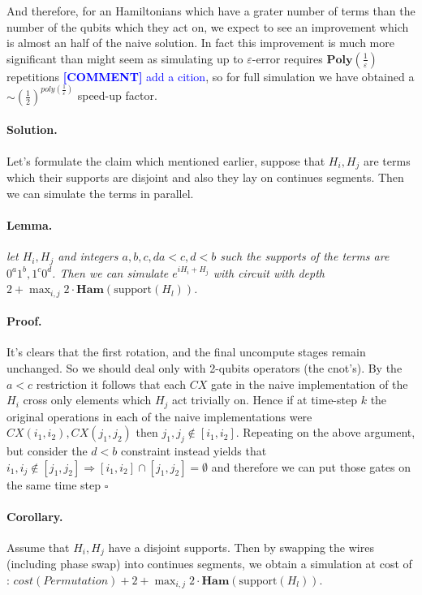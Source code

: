 \documentclass{article}
\newcommand{\commentt}[1]{\textcolor{blue}{ \textbf{[COMMENT]} #1}}
\newcommand{\ctt}[1]{\commentt{#1}}
\begin{document}
\begin{multicols*}{2}
And therefore, for an Hamiltonians which have a grater number of terms than the number of the qubits which they act on, we expect to see an improvement which is almost an half of the naive solution. In fact this improvement is much more significant than might seem as simulating up to \(\varepsilon\)-error requires \(\textbf{Poly} \left( \frac{1}{\varepsilon} \right) \) repetitions\ctt{add a cition}, so for full simulation we have obtained a \( \sim (\frac{1}{2})^{poly(\frac{1}{\varepsilon})} \) speed-up factor.  

\paragraph{Solution.} Let's formulate the claim which mentioned earlier, suppose that \(H_{i} ,H_{j}\) are terms which their supports are disjoint and also they lay on continues segments. Then we can simulate the terms in parallel. 
\paragraph{Lemma.} \textit{ let \(H_{i}, H_{j}\) and integers \(a,b,c,d a < c, d < b\) such the supports of the terms are \( 0^{a}1^{b}, 1^{c}0^{d}\). Then we can simulate \(e^{i H_{i} + H_{j}}\) with circuit with depth \( 2 + \max_{ {i,j} } 2 \cdot \textbf{Ham} ( \text{support} ( H_{l} ) )\).}
\paragraph{Proof.} It's clears that the first rotation, and the final uncompute stages remain unchanged. So we should deal only with 2-qubits operators (the cnot's). By the \( a < c \) restriction it follows that each \(CX\) gate in the naive implementation of the \(H_i\) cross only elements which \(H_j\) act trivially on. Hence if at time-step \(k\) the original operations in each of the naive implementations were \( CX(i_{1} , i_{2}), CX(j_{1} , j_{2}) \) then \( j_{1}, j_{j} \notin [i_{1} , i_{2}] \). Repeating on the above argument, but consider the \(d<b\) constraint instead yields that \( i_{1}, i_{j} \notin [j_{1} , j_{2}] \Rightarrow [i_{1},i_{2}]\cap[j_{1},j_{2}] = \emptyset  \) and therefore we can put those gates on the same time step \( \square\)   

\paragraph{Corollary.} Assume that \(H_{i}, H_{j}\) have a disjoint supports. Then by swapping the wires (including phase swap) into continues segments, we obtain a simulation at cost of : \( cost( Permutation ) + 2 + \max_{ {i,j} } 2 \cdot \textbf{Ham} ( \text{support} ( H_{l} ) )\).  


\end{multicols*}
\end{document}
